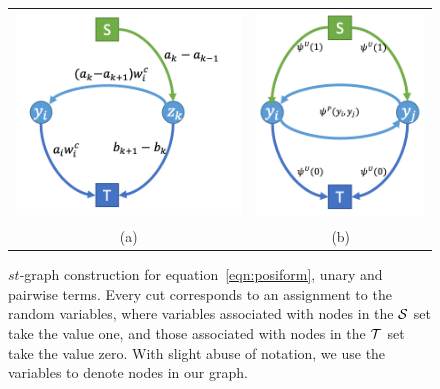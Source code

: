 

\begin{figure}[t]
  \centering
  \setlength{\tabcolsep}{2pt}
  \begin{tabular}{cc}
    \includegraphics[width=0.54\columnwidth]{Methodology/figures/ho.png}&
                                                                         \includegraphics[width=0.4\columnwidth]{Methodology/figures/up.png}\\
                                                                         {\small (a)} & {\small (b)} 
  \end{tabular}
  \caption{\label{fig:stmincut} $st$-graph construction for
    equation~\eqref{eqn:posiform}, unary and pairwise terms.
    Every cut corresponds to an assignment to the random
    variables, where variables associated with nodes in the ${\mathcal{S}}$
    set take the value one, and those associated with nodes in
    the ${\mathcal{T}}$ set take the value zero. With slight abuse of
    notation, we use the variables to denote nodes in our graph.}
\end{figure}

